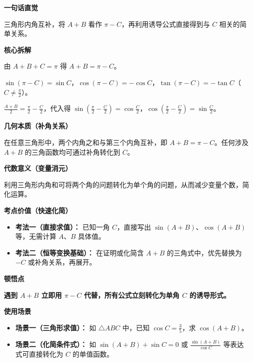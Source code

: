 \begin{explanationbox}
	\textbf{\textcolor{CExplanation}{一句话直觉}}

	三角形内角互补，将 $A+B$ 看作 $\pi - C$，再利用诱导公式直接得到与 $C$ 相关的简单关系。

	\medskip
	\textbf{\textcolor{CExplanation}{核心拆解}}
	\begin{description}[style=nextline, leftmargin=2.8em, labelsep=0.5em, itemsep=0.45em]
		\item[\textbf{要点一（补角代换）：}] 由 $A+B+C=\pi$ 得 $A+B = \pi - C$。
		\item[\textbf{要点二（诱导转化）：}] $\sin(\pi - C) = \sin C$，$\cos(\pi - C) = -\cos C$，$\tan(\pi - C) = -\tan C$（$C\neq\frac{\pi}{2}$）。
		\item[\textbf{要点三（半角互余）：}] $\frac{A+B}{2} = \frac{\pi}{2} - \frac{C}{2}$，代入得 $\sin(\frac{\pi}{2} - \frac{C}{2}) = \cos\frac{C}{2}$，$\cos(\frac{\pi}{2} - \frac{C}{2}) = \sin\frac{C}{2}$。
	\end{description}

	\medskip
	\textbf{\textcolor{CExplanation}{几何本质（补角关系）}}

	在任意三角形中，两个内角之和与第三个内角互补，即 $A+B = \pi - C$。任何涉及 $A+B$ 的三角函数均可通过补角转化到 $C$。

	\medskip
	\textbf{\textcolor{CExplanation}{代数意义（变量消元）}}

	利用三角形内角和可将两个角的问题转化为单个角的问题，从而减少变量个数，简化运算。

	\medskip
	\textbf{\textcolor{CExplanation}{考点价值（快速化简）}}
	\begin{itemize}[leftmargin=*, itemsep=0.5em, topsep=0.4em]
		\item \textbf{考法一（直接求值）：} 已知一角 $C$，直接写出 $\sin(A+B)$、$\cos(A+B)$ 等，无需计算 $A$、$B$ 具体值。
		\item \textbf{考法二（恒等变换基础）：} 在证明或化简含 $A+B$ 的三角式中，优先替换为 $-C$ 或补角关系，再展开。
	\end{itemize}

	\medskip
	\textbf{\textcolor{CExplanation}{顿悟点}}

	\textbf{遇到 $A+B$ 立即用 $\pi - C$ 代替，所有公式立刻转化为单角 $C$ 的诱导形式。}

	\medskip
	\textbf{\textcolor{CExplanation}{使用场景}}
	\begin{itemize}[leftmargin=*, itemsep=0.5em, topsep=0.4em]
		\item \textbf{场景一（三角形求值）：} 如 $\triangle ABC$ 中，已知 $\cos C = \frac{3}{5}$，求 $\cos(A+B)$。
		\item \textbf{场景二（化简条件式）：} 如 $\sin(A+B) + \sin C = 0$ 或 $\frac{\sin(A+B)}{\cos C}$ 等表达式可直接转化为 $C$ 的单值函数。
	\end{itemize}
\end{explanationbox}
